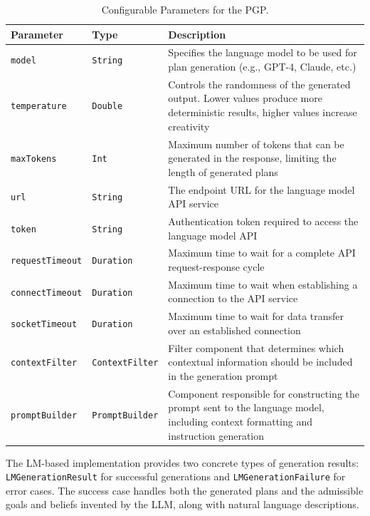 \documentclass[12pt,a4paper,openright,twoside]{book}
\begin{document}
\begin{table}[htbp]
\centering
\begin{tabular}{|l|l|p{7cm}|}
\toprule
\textbf{Parameter} & \textbf{Type} & \textbf{Description} \\
\midrule
\texttt{model} & \texttt{String} & Specifies the language model to be used for plan generation (e.g., GPT-4, Claude, etc.) \\
\midrule
\texttt{temperature} & \texttt{Double} & Controls the randomness of the generated output. Lower values produce more deterministic results, higher values increase creativity \\
\midrule
\texttt{maxTokens} & \texttt{Int} & Maximum number of tokens that can be generated in the response, limiting the length of generated plans \\
\midrule
\texttt{url} & \texttt{String} & The endpoint URL for the language model API service \\
\midrule
\texttt{token} & \texttt{String} & Authentication token required to access the language model API \\
\midrule
\texttt{requestTimeout} & \texttt{Duration} & Maximum time to wait for a complete API request-response cycle \\
\midrule
\texttt{connectTimeout} & \texttt{Duration} & Maximum time to wait when establishing a connection to the API service \\
\midrule
\texttt{socketTimeout} & \texttt{Duration} & Maximum time to wait for data transfer over an established connection \\
\midrule
\texttt{contextFilter} & \texttt{ContextFilter} & Filter component that determines which contextual information should be included in the generation prompt \\
\midrule
\texttt{promptBuilder} & \texttt{PromptBuilder} & Component responsible for constructing the prompt sent to the language model, including context formatting and instruction generation \\
\bottomrule
\end{tabular}
\caption{Configurable Parameters for the \ac{PGP}.}
\label{pgp-params}
\end{table}

The LM-based implementation provides two concrete types of generation results: \texttt{LMGenerationResult} for successful generations and \texttt{LMGenerationFailure} for error cases.
%
The success case handles both the generated plans and the admissible goals and beliefs invented by the \ac{LLM}, along with natural language descriptions.
\end{document}
